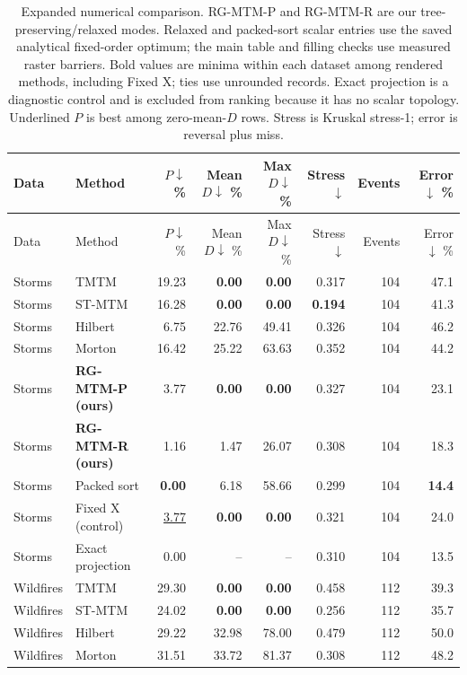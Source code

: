 \begingroup\small\setlength{\tabcolsep}{3pt}
\begin{longtable}{llrrrrrr}
\caption{Expanded numerical comparison. RG-MTM-P and RG-MTM-R are our tree-preserving/relaxed modes. Relaxed and packed-sort scalar entries use the saved analytical fixed-order optimum; the main table and filling checks use measured raster barriers. Bold values are minima within each dataset among rendered methods, including Fixed X; ties use unrounded records. Exact projection is a diagnostic control and is excluded from ranking because it has no scalar topology. Underlined $P$ is best among zero-mean-$D$ rows. Stress is Kruskal stress-1; error is reversal plus miss.}\\\toprule
Data & Method & $P\downarrow$ \% & Mean $D\downarrow$ \% & Max $D\downarrow$ \% & Stress $\downarrow$ & Events & Error $\downarrow$ \%\\\midrule\endfirsthead
\toprule Data & Method & $P\downarrow$ \% & Mean $D\downarrow$ \% & Max $D\downarrow$ \% & Stress $\downarrow$ & Events & Error $\downarrow$ \%\\\midrule\endhead
\bottomrule\endfoot
Storms & TMTM & 19.23 & \textbf{0.00} & \textbf{0.00} & 0.317 & 104 & 47.1\\
Storms & ST-MTM & 16.28 & \textbf{0.00} & \textbf{0.00} & \textbf{0.194} & 104 & 41.3\\
Storms & Hilbert & 6.75 & 22.76 & 49.41 & 0.326 & 104 & 46.2\\
Storms & Morton & 16.42 & 25.22 & 63.63 & 0.352 & 104 & 44.2\\
Storms & \textbf{RG-MTM-P (ours)} & 3.77 & \textbf{0.00} & \textbf{0.00} & 0.327 & 104 & 23.1\\
Storms & \textbf{RG-MTM-R (ours)} & 1.16 & 1.47 & 26.07 & 0.308 & 104 & 18.3\\
Storms & Packed sort & \textbf{0.00} & 6.18 & 58.66 & 0.299 & 104 & \textbf{14.4}\\
Storms & Fixed X (control) & \underline{3.77} & \textbf{0.00} & \textbf{0.00} & 0.321 & 104 & 24.0\\
Storms & Exact projection & 0.00 & -- & -- & 0.310 & 104 & 13.5\\
Wildfires & TMTM & 29.30 & \textbf{0.00} & \textbf{0.00} & 0.458 & 112 & 39.3\\
Wildfires & ST-MTM & 24.02 & \textbf{0.00} & \textbf{0.00} & 0.256 & 112 & 35.7\\
Wildfires & Hilbert & 29.22 & 32.98 & 78.00 & 0.479 & 112 & 50.0\\
Wildfires & Morton & 31.51 & 33.72 & 81.37 & 0.308 & 112 & 48.2\\

\end{longtable}
